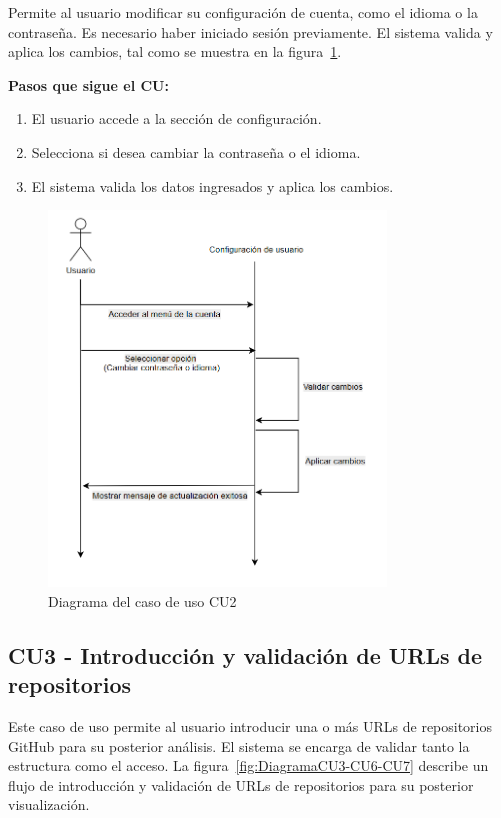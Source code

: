 Permite al usuario modificar su configuración de cuenta, como el idioma o la contraseña. Es necesario haber iniciado sesión previamente. El sistema valida y aplica los cambios, tal como se muestra en la figura~\ref{fig:DiagramaCU2}.

\textbf{Pasos que sigue el CU:}
\begin{enumerate}
  \item El usuario accede a la sección de configuración.
  \item Selecciona si desea cambiar la contraseña o el idioma.
  \item El sistema valida los datos ingresados y aplica los cambios.
\end{enumerate}

\begin{figure}[H]
\centering
\includegraphics[width=0.8\textwidth]{img/DiagramaCU2.png}
\caption{Diagrama del caso de uso CU2}
\label{fig:DiagramaCU2}
\end{figure}

\subsection*{CU3 - Introducción y validación de URLs de repositorios}

Este caso de uso permite al usuario introducir una o más URLs de repositorios GitHub para su posterior análisis. El sistema se encarga de validar tanto la estructura como el acceso. La figura~\ref{fig:DiagramaCU3-CU6-CU7} describe un flujo de introducción y validación de URLs de repositorios para su posterior visualización.

